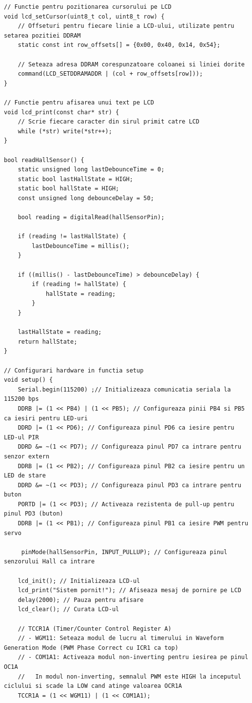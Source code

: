 \documentclass[a4paper,12pt]{report}
\begin{document}
\begin{lstlisting}
// Functie pentru pozitionarea cursorului pe LCD
void lcd_setCursor(uint8_t col, uint8_t row) {
    // Offseturi pentru fiecare linie a LCD-ului, utilizate pentru setarea pozitiei DDRAM
    static const int row_offsets[] = {0x00, 0x40, 0x14, 0x54};

    // Seteaza adresa DDRAM corespunzatoare coloanei si liniei dorite
    command(LCD_SETDDRAMADDR | (col + row_offsets[row]));
}

// Functie pentru afisarea unui text pe LCD
void lcd_print(const char* str) {
    // Scrie fiecare caracter din sirul primit catre LCD
    while (*str) write(*str++);
}

bool readHallSensor() {
    static unsigned long lastDebounceTime = 0;
    static bool lastHallState = HIGH;
    static bool hallState = HIGH;
    const unsigned long debounceDelay = 50;
    
    bool reading = digitalRead(hallSensorPin);
    
    if (reading != lastHallState) {
        lastDebounceTime = millis();
    }
    
    if ((millis() - lastDebounceTime) > debounceDelay) {
        if (reading != hallState) {
            hallState = reading;
        }
    }
    
    lastHallState = reading;
    return hallState;
}

// Configurari hardware in functia setup
void setup() {
    Serial.begin(115200) ;// Initializeaza comunicatia seriala la 115200 bps
    DDRB |= (1 << PB4) | (1 << PB5); // Configureaza pinii PB4 si PB5 ca iesiri pentru LED-uri
    DDRD |= (1 << PD6); // Configureaza pinul PD6 ca iesire pentru LED-ul PIR
    DDRD &= ~(1 << PD7); // Configureaza pinul PD7 ca intrare pentru senzor extern
    DDRB |= (1 << PB2); // Configureaza pinul PB2 ca iesire pentru un LED de stare
    DDRD &= ~(1 << PD3); // Configureaza pinul PD3 ca intrare pentru buton
    PORTD |= (1 << PD3); // Activeaza rezistenta de pull-up pentru pinul PD3 (buton)
    DDRB |= (1 << PB1); // Configureaza pinul PB1 ca iesire PWM pentru servo

     pinMode(hallSensorPin, INPUT_PULLUP); // Configureaza pinul senzorului Hall ca intrare

    lcd_init(); // Initializeaza LCD-ul
    lcd_print("Sistem pornit!"); // Afiseaza mesaj de pornire pe LCD
    delay(2000); // Pauza pentru afisare
    lcd_clear(); // Curata LCD-ul
    
    // TCCR1A (Timer/Counter Control Register A)
    // - WGM11: Seteaza modul de lucru al timerului in Waveform Generation Mode (PWM Phase Correct cu ICR1 ca top)
    // - COM1A1: Activeaza modul non-inverting pentru iesirea pe pinul OC1A
    //   In modul non-inverting, semnalul PWM este HIGH la inceputul ciclului si scade la LOW cand atinge valoarea OCR1A
    TCCR1A = (1 << WGM11) | (1 << COM1A1);


\end{lstlisting}
\end{document}
